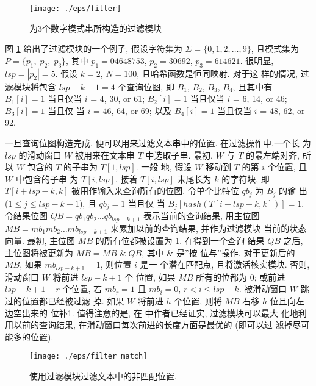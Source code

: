 \documentclass{ws-ijprai}
\begin{document}
\begin{figure}[htbp]
  \centering
  \texttt{[image: ./eps/filter]}
  \caption{为3个数字模式串所构造的过滤模块}
  \label{fig:filter}
\end{figure}

图 \ref{fig:filter} 给出了过滤模块的一个例子, 假设字符集为
$\Sigma = \{0, 1, 2, \dots, 9\}$, 且模式集为 $P = \{p_1,\; p_2,\;
p_3\}$, 其中 $p_1 = 04648753$, $p_2 = 30692$, $p_3 = 614621$. 很明显,
$lsp = |p_2|= 5$. 假设 $k = 2$, $N = 100$, 且哈希函数是恒同映射. 对于这
样的情况, 过滤模块将包含 $lsp - k + 1 = 4$ 个查询位图, 即 $B_1$,
$B_2$, $B_3$, $B_4$, 且其中有 $B_1[i] = 1$ 当且仅当 $i$ = 4, 30, or
61; $B_2[i] = 1$ 当且仅当 $i$ = 6, 14, or 46; $B_3[i] = 1$ 当且仅
当 $i$ = 46, 64, or 69; 以及 $B_4[i] = 1$ 当且仅当 $i$ = 48, 62, or
92.

一旦查询位图构造完成, 便可以用来过滤文本串中的位置. 在过滤操作中,一个长
为 $lsp$ 的滑动窗口 $W$ 被用来在文本串 $T$ 中选取子串. 最初,
$W$ 与 $T$ 的最左端对齐, 所以 $W$ 包含的 $T$ 的子串为 $T[1,lsp]$. 一般
地, 假设 $W$ 移动到 $T$ 的第 $i$ 个位置, 且 $W$ 中包含的子串
为 $T[i,lsp]$. 接着 $T[i,lsp]$ 末尾长为 $k$ 的字符块, 即 $T[i+lsp-k,
k]$ 被用作输入来查询所有的位图. 令单个比特位 $qb_j$ 为 $B_j$ 的输
出 ($1 \leq j \leq lsp - k + 1$), 且 $qb_j=1$ 当且仅
当 $B_j[hash(T[i+lsp-k,k])] = 1$. 令结果位图
$QB = qb_1qb_2 \dots qb_{lsp-k+1}$ 表示当前的查询结果, 用主位图
$MB = mb_1mb_2 \dots mb_{lsp-k+1}$ 来累加以前的查询结果, 并作为过滤模块
当前的状态向量. 最初, 主位图 $MB$ 的所有位都被设置为 1. 在得到一个查询
结果 $QB$ 之后, 主位图将被更新为 $MB = MB \; \& \; QB$, 其中 \& 是''按
位与''操作. 对于更新后的 $MB$, 如果 $mb_{lsp-k+1} = 1$, 则位置 $i$ 是一
个潜在匹配点, 且将激活核实模块. 否则, 滑动窗口 $W$ 将前进 $lsp-k+1$ 个
位置, 如果 $MB$ 所有的位都为 0; 或前进 $lsp-k+1-r$ 个位置, 若 $mb_r=1$
且 $mb_i=0$, $r < i \leq lsp-k$. 被滑动窗口 $W$ 跳过的位置都已经被过滤
掉.  如果 $W$ 将前进 $h$ 个位置, 则将 $MB$ 右移 $h$ 位且向左边空出来的
位补1. 值得注意的是, 在 \cite{Lee2013} 中作者已经证实, 过滤模块可以最大
化地利用以前的查询结果, 在滑动窗口每次前进的长度方面是最优的 (即可以过
滤掉尽可能多的位置).

\begin{figure}[htbp]
  \centering
  \texttt{[image: ./eps/filter\_match]}
  \caption{使用过滤模块过滤文本中的非匹配位置.}
  \label{fig:f_match}
\end{figure}
\end{document}
